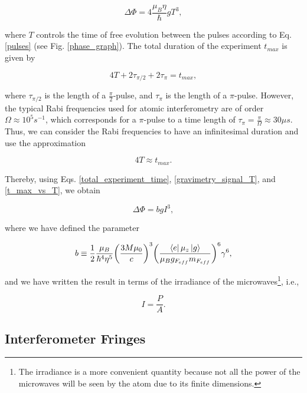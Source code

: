 \documentclass{article}
\begin{document}
\begin{equation}\label{gravimetry_signal_T}
    \Delta \Phi = 4 \frac{\mu_{B} \eta }{\hbar} g T^{3},
\end{equation}

where $T$ controls the time of free evolution between the pulses according to Eq. \ref{pulses} (see Fig. \ref{phase_graph}). The total duration of the experiment $t_{max}$ is given by

\begin{equation}
    4 T + 2\tau_{\pi/2} + 2\tau_{\pi} = t_{max},
\end{equation}

where $\tau_{\pi/2}$ is the length of a $\frac{\pi}{2}$-pulse, and $\tau_{\pi}$ is the length of a $\pi$-pulse. However, the typical Rabi frequencies used for atomic interferometry are of order $\Omega \approx 10^5 s^{-1}$, which corresponds for a $\pi$-pulse to a time length of $\tau_{\pi} = \frac{\pi}{\Omega} \approx 30 \mu s$. Thus, we can consider the Rabi frequencies to have an infinitesimal duration and use the approximation

\begin{equation}\label{t_max_vs_T}
    4T \approx t_{max}.
\end{equation}

Thereby, using Eqs. \ref{total_experiment_time}, \ref{gravimetry_signal_T}, and \ref{t_max_vs_T}, we obtain

\begin{equation}\label{gravimetry_signal_irradiance}
    \Delta \Phi = b g I^3, 
\end{equation}

where we have defined the parameter

\begin{equation}
    b \equiv \frac{1}{2} \frac{ \mu_{B}}{ \hbar^{4} \eta^{5}} \bigg(\frac{3M \mu_{0}}{c} \bigg)^{3} \bigg(\frac{\bra{e} \mu_{z} \ket{g}}{\mu_{B} g_{F_{eff}} m_{F_{eff}}} \bigg)^{6} \gamma^6,
\end{equation}

and we have written the result in terms of the irradiance of the microwaves\footnote{The irradiance is a more convenient quantity because not all the power of the microwaves will be seen by the atom due to its finite dimensions.}, i.e.,

\begin{equation}
    I = \frac{P}{A}.
\end{equation}

\subsection{Interferometer Fringes}
\end{document}
